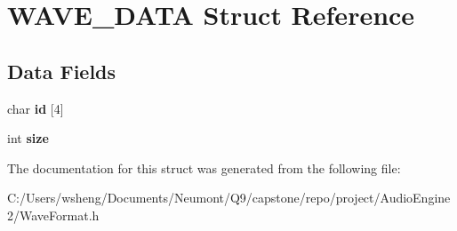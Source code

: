 \hypertarget{struct_w_a_v_e___d_a_t_a}{}\section{W\+A\+V\+E\+\_\+\+D\+A\+TA Struct Reference}
\label{struct_w_a_v_e___d_a_t_a}
\subsection*{Data Fields}
\begin{DoxyCompactItemize}
\item 
\mbox{\label{struct_w_a_v_e___d_a_t_a_ace593da5319500315498c8f845ee2368}} 
char {\bfseries id} \mbox{[}4\mbox{]}
\item 
\mbox{\label{struct_w_a_v_e___d_a_t_a_a439227feff9d7f55384e8780cfc2eb82}} 
int {\bfseries size}
\end{DoxyCompactItemize}


The documentation for this struct was generated from the following file\+:\begin{DoxyCompactItemize}
\item 
C\+:/\+Users/wsheng/\+Documents/\+Neumont/\+Q9/capstone/repo/project/\+Audio\+Engine2/Wave\+Format.\+h\end{DoxyCompactItemize}
